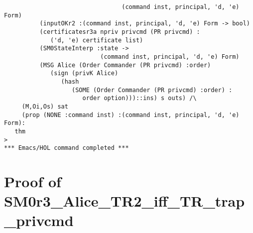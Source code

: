 \documentclass{report}
\begin{document}
\begin{session}
\begin{scriptsize}
\begin{verbatim}
                                 (command inst, principal, 'd, 'e) Form)
          (inputOKr2 :(command inst, principal, 'd, 'e) Form -> bool)
          (certificatesr3a npriv privcmd (PR privcmd) :
             ('d, 'e) certificate list)
          (SM0StateInterp :state ->
                           (command inst, principal, 'd, 'e) Form)
          (MSG Alice (Order Commander (PR privcmd) :order)
             (sign (privK Alice)
                (hash
                   (SOME (Order Commander (PR privcmd) :order) :
                      order option)))::ins) s outs) /\
     (M,Oi,Os) sat
     (prop (NONE :command inst) :(command inst, principal, 'd, 'e) Form):
   thm
> 
*** Emacs/HOL command completed ***

\end{verbatim}
  \end{scriptsize}
\end{session}

\section{Proof of SM0r3_Alice_TR2_iff_TR_trap_privcmd}
\label{proof-8}
\end{document}
